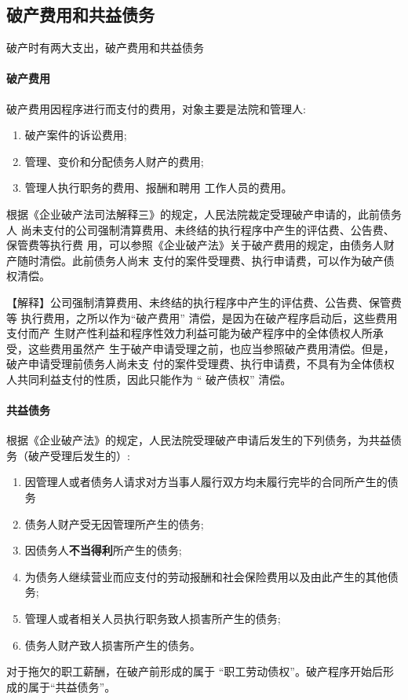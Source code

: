 \documentclass[UTF8,12pt]{ctexart}
\numberwithin{equation}{section} %
\numberwithin{figure}{section}
\numberwithin{table}{section}
\begin{document}
	
	
	\subsection{破产费用和共益债务}
	破产时有两大支出，破产费用和共益债务
	
	\paragraph{破产费用}
	破产费用因程序进行而支付的费用，对象主要是法院和管理人: 
	\begin{enumerate}
		\item 破产案件的诉讼费用;
		
		\item 管理、变价和分配债务人财产的费用;
		
		\item 管理人执行职务的费用、报酬和聘用 工作人员的费用。
	\end{enumerate}
	
	根据《企业破产法司法解释三》的规定，人民法院裁定受理破产申请的，此前债务人 尚未支付的公司强制清算费用、未终结的执行程序中产生的评估费、公告费、保管费等执行费 用，可以参照《企业破产法》关于破产费用的规定，由债务人财产随时清偿。此前债务人尚末 支付的案件受理费、执行申请费，可以作为破产债权清偿。 
	
	【解释】公司强制清算费用、未终结的执行程序中产生的评估费、公告费、保管费等 执行费用，之所以作为“破产费用” 清偿，是因为在破产程序启动后，这些费用支付而产 生财产性利益和程序性效力利益可能为破产程序中的全体债权人所承受，这些费用虽然产 生于破产申请受理之前，也应当参照破产费用清偿。但是，破产申请受理前债务人尚未支 付的案件受理费、执行申请费，不具有为全体债权人共同利益支付的性质，因此只能作为 “ 破产债权” 清偿。
	
	\paragraph{共益债务}
	根据《企业破产法》的规定，人民法院受理破产申请后发生的下列债务，为共益债务（破产受理后发生的）: 
	\begin{enumerate}
		\item 因管理人或者债务人请求对方当事人履行双方均未履行完毕的合同所产生的债务
		
		\item 债务人财产受无因管理所产生的债务;
		
		\item 因债务人\textbf{不当得利}所产生的债务;
		
		\item 为债务人继续营业而应支付的劳动报酬和社会保险费用以及由此产生的其他债务; 
		
		\item 管理人或者相关人员执行职务致人损害所产生的债务;
		
		\item 债务人财产致人损害所产生的债务。
	\end{enumerate}
	对于拖欠的职工薪酬，在破产前形成的属于 “职工劳动债权”。破产程序开始后形成的属于“共益债务”。
	
\end{document}
